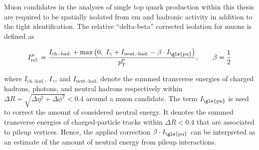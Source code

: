 
Muon candidates in the analyses of single top quark production within this thesis are required to be spatially isolated from \gls{em} and hadronic activity in addition to the tight identification. The relative ``delta-beta'' corrected isolation for muons is defined as

\begin{equation}
I_\mathrm{rel.}^{\mu}=\frac{I_\text{ch.-had.}+\max\left(0,~I_{\gamma}+I_\text{neut.-had.}-\beta\cdot I_\text{\gls{pu}}\right)}{\pt^\mu},\qquad \beta=\frac{1}{2}
\end{equation}

where $I_\text{ch.-had.}$, $I_{\gamma}$, and $I_\text{neut.-had.}$ denote the summed transverse energies of charged hadrons, photons, and neutral hadrons respectively within $\Delta R=\sqrt{\Delta\eta^{2}+\Delta\phi^{2}}<0.4$ around a muon candidate. The term $I_\text{\gls{pu}}$ is used to correct the amount of considered neutral energy. It denotes the summed transverse energies of charged-particle tracks within $\Delta R<0.4$ that are associated to pileup vertices. Hence, the applied correction $\beta\cdot I_\text{\gls{pu}}$ can be interpreted as an estimate of the amount of neutral energy from pileup interactions.

